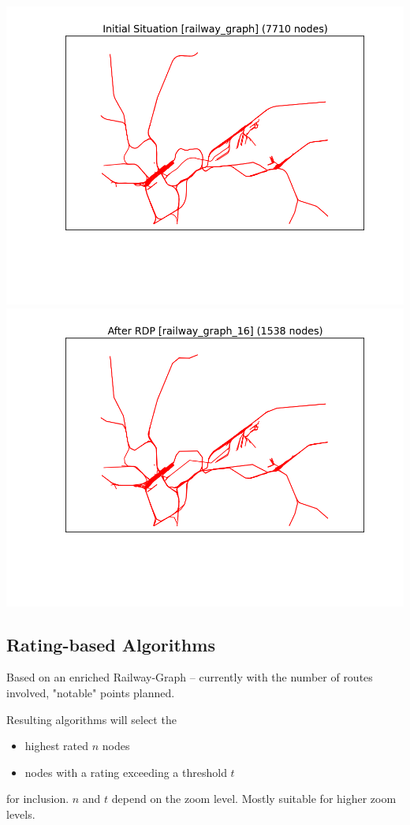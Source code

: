 \documentclass[twoside]{scrartcl}
\begin{document}
\includegraphics[scale=0.49]{rdprg-1.png}
\includegraphics[scale=0.49]{rdprg-2.png}

\subsection{Rating-based Algorithms}
Based on an enriched Railway-Graph -- currently with the number of routes
involved, "notable" points planned.

Resulting algorithms will select the
\begin{itemize}
\item highest rated \(n\) nodes
\item nodes with a rating exceeding a threshold \(t\)
\end{itemize}
for inclusion.
\(n\) and \(t\) depend on the zoom  level.
Mostly suitable for higher zoom levels.
\end{document}
